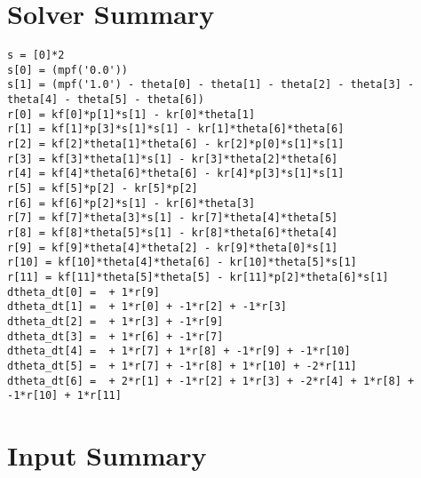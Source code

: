 \documentclass[a4paper,8pt]{report}
\begin{document}
\section{Solver Summary}
\begin{verbatim}s = [0]*2
s[0] = (mpf('0.0'))
s[1] = (mpf('1.0') - theta[0] - theta[1] - theta[2] - theta[3] - theta[4] - theta[5] - theta[6])
r[0] = kf[0]*p[1]*s[1] - kr[0]*theta[1]
r[1] = kf[1]*p[3]*s[1]*s[1] - kr[1]*theta[6]*theta[6]
r[2] = kf[2]*theta[1]*theta[6] - kr[2]*p[0]*s[1]*s[1]
r[3] = kf[3]*theta[1]*s[1] - kr[3]*theta[2]*theta[6]
r[4] = kf[4]*theta[6]*theta[6] - kr[4]*p[3]*s[1]*s[1]
r[5] = kf[5]*p[2] - kr[5]*p[2]
r[6] = kf[6]*p[2]*s[1] - kr[6]*theta[3]
r[7] = kf[7]*theta[3]*s[1] - kr[7]*theta[4]*theta[5]
r[8] = kf[8]*theta[5]*s[1] - kr[8]*theta[6]*theta[4]
r[9] = kf[9]*theta[4]*theta[2] - kr[9]*theta[0]*s[1]
r[10] = kf[10]*theta[4]*theta[6] - kr[10]*theta[5]*s[1]
r[11] = kf[11]*theta[5]*theta[5] - kr[11]*p[2]*theta[6]*s[1]
dtheta_dt[0] =  + 1*r[9]
dtheta_dt[1] =  + 1*r[0] + -1*r[2] + -1*r[3]
dtheta_dt[2] =  + 1*r[3] + -1*r[9]
dtheta_dt[3] =  + 1*r[6] + -1*r[7]
dtheta_dt[4] =  + 1*r[7] + 1*r[8] + -1*r[9] + -1*r[10]
dtheta_dt[5] =  + 1*r[7] + -1*r[8] + 1*r[10] + -2*r[11]
dtheta_dt[6] =  + 2*r[1] + -1*r[2] + 1*r[3] + -2*r[4] + 1*r[8] + -1*r[10] + 1*r[11]
\end{verbatim}\section{Input Summary}
\end{document}
